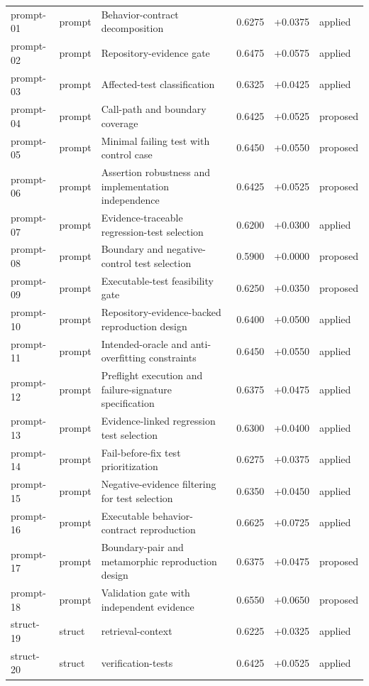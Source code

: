 \begin{center}
\begin{longtable}{llp{5.2cm}rrl}
prompt-01 & prompt & Behavior-contract decomposition & 0.6275 & +0.0375 & applied \\
prompt-02 & prompt & Repository-evidence gate & 0.6475 & +0.0575 & applied \\
prompt-03 & prompt & Affected-test classification & 0.6325 & +0.0425 & applied \\
prompt-04 & prompt & Call-path and boundary coverage & 0.6425 & +0.0525 & proposed \\
prompt-05 & prompt & Minimal failing test with control case & 0.6450 & +0.0550 & proposed \\
prompt-06 & prompt & Assertion robustness and implementation independence & 0.6425 & +0.0525 & proposed \\
prompt-07 & prompt & Evidence-traceable regression-test selection & 0.6200 & +0.0300 & applied \\
prompt-08 & prompt & Boundary and negative-control test selection & 0.5900 & +0.0000 & proposed \\
prompt-09 & prompt & Executable-test feasibility gate & 0.6250 & +0.0350 & proposed \\
prompt-10 & prompt & Repository-evidence-backed reproduction design & 0.6400 & +0.0500 & applied \\
prompt-11 & prompt & Intended-oracle and anti-overfitting constraints & 0.6450 & +0.0550 & applied \\
prompt-12 & prompt & Preflight execution and failure-signature specification & 0.6375 & +0.0475 & applied \\
prompt-13 & prompt & Evidence-linked regression test selection & 0.6300 & +0.0400 & applied \\
prompt-14 & prompt & Fail-before-fix test prioritization & 0.6275 & +0.0375 & applied \\
prompt-15 & prompt & Negative-evidence filtering for test selection & 0.6350 & +0.0450 & applied \\
prompt-16 & prompt & Executable behavior-contract reproduction & 0.6625 & +0.0725 & applied \\
prompt-17 & prompt & Boundary-pair and metamorphic reproduction design & 0.6375 & +0.0475 & proposed \\
prompt-18 & prompt & Validation gate with independent evidence & 0.6550 & +0.0650 & proposed \\
struct-19 & struct & retrieval-context & 0.6225 & +0.0325 & applied \\
struct-20 & struct & verification-tests & 0.6425 & +0.0525 & applied \\

\end{longtable}
\end{center}
